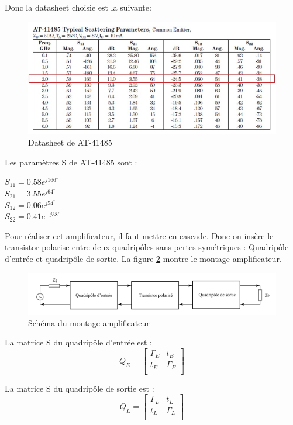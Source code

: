 \documentclass[french]{article}
\begin{document}
Donc la datasheet choisie est la suivante: 
\begin{figure}[H]
	\centering
	\includegraphics[width=0.9\linewidth]{../5SynthAmp/Datasheet_AT41485}
	\caption{Datasheet de AT-41485}
	\label{fig:datasheet_AT}
\end{figure}

Les paramètres S de AT-41485 sont :

{\centering
$S_{11}=0.58e^{j166^{\circ}}$\\
$S_{21}=3.55e^{j64^{\circ}}$\\
$S_{12}=0.06e^{j54^{\circ}}$\\
$S_{22}=0.41e^{-j38^{\circ}}$\\
}

Pour réaliser cet amplificateur, il faut mettre en cascade. Donc on insère le transistor polarise entre deux quadripôles sans pertes symétriques : Quadripôle d’entrée et quadripôle de sortie. La figure \ref{fig:schema_ampli} montre le montage amplificateur. 
\begin{figure}[H]
	\centering
	\includegraphics[width=0.9\linewidth]{../5SynthAmp/Schema_ampli}
	\caption{Schéma du montage amplificateur}
	\label{fig:schema_ampli}
\end{figure}

La matrice S du quadripôle d’entrée est :
\begin{equation}
	Q_{E} = \begin{bmatrix}
		\Gamma_{E} & t_{E}\\
		t_{E} & \Gamma_{E}\\
	\end{bmatrix}
\end{equation}

La matrice S du quadripôle de sortie est :
\begin{equation}
	Q_{L} = \begin{bmatrix}
		\Gamma_{L} & t_{L}\\
		t_{L} & \Gamma_{L}\\
	\end{bmatrix}
\end{equation}
\end{document}
